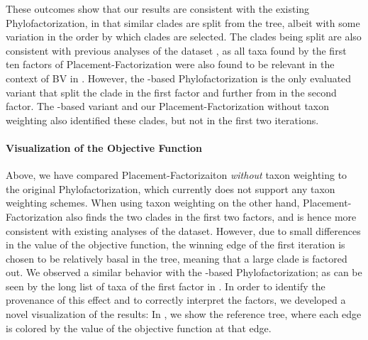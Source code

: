 These outcomes show that our results are consistent with the existing Phylofactorization,
in that similar clades are split from the tree,
albeit with some variation in the order by which clades are selected. %
The clades being split are also consistent with previous analyses of the dataset \cite{Srinivasan2012},
as all taxa found by the first ten factors of Placement-Factorization
were also found to be relevant in the context of \acl{BV} in \cite{Srinivasan2012}.
However, the -based Phylofactorization is the only evaluated variant
that split the  clade in the first factor
and further  from  in the second factor.
The -based variant and our Placement-Factorization without taxon weighting also identified these clades,
but not in the first two iterations.


\paragraph{Visualization of the Objective Function}
\label{sec:Factorization:sub:Evaluation:sub:BVDataset:par:VizObjective}

Above, we have compared Placement-Factorizaiton \emph{without} taxon weighting to the original Phylofactorization,
which currently does not support any taxon weighting schemes.
When using taxon weighting on the other hand,
Placement-Factorization also finds the two  clades in the first two factors,
and is hence more consistent with existing analyses of the dataset.
However, due to small differences in the value of the objective function,
the winning edge of the first iteration
is chosen to be relatively basal in the tree, meaning that a large clade is factored out.
We observed a similar behavior with the -based Phylofactorization;
as can be seen by the long list of taxa of the first factor in .
In order to identify the provenance of this effect and to correctly interpret the factors,
we developed a novel visualization of the results:
In , we show the reference tree,
where each edge is colored by the value of the objective function at that edge.

